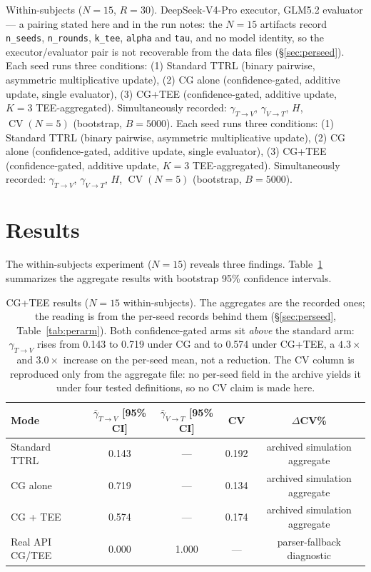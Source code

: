 \documentclass[11pt]{article}
\DeclareMathOperator{\CV}{CV}
\begin{document}
Within-subjects ($N{=}15$, $R{=}30$). DeepSeek-V4-Pro executor, GLM5.2 evaluator --- a pairing stated here and in the run notes: the $N{=}15$ artifacts record \texttt{n\_seeds}, \texttt{n\_rounds}, \texttt{k\_tee}, \texttt{alpha} and \texttt{tau}, and no model identity, so the executor/evaluator pair is not recoverable from the data files (\S\ref{sec:perseed}). Each seed runs three conditions: (1) Standard TTRL (binary pairwise, asymmetric multiplicative update), (2) CG alone (confidence-gated, additive update, single evaluator), (3) CG+TEE (confidence-gated, additive update, $K{=}3$ TEE-aggregated). Simultaneously recorded: $\gamma_{T\to V}$, $\gamma_{V\to T}$, $H$, $\CV(N{=}5)$ (bootstrap, $B{=}5000$). Each seed runs three conditions: (1) Standard TTRL (binary pairwise, asymmetric multiplicative update), (2) CG alone (confidence-gated, additive update, single evaluator), (3) CG+TEE (confidence-gated, additive update, $K{=}3$ TEE-aggregated). Simultaneously recorded: $\gamma_{T\to V}$, $\gamma_{V\to T}$, $H$, $\CV(N{=}5)$ (bootstrap, $B{=}5000$).

\section{Results}

The within-subjects experiment ($N{=}15$) reveals three findings. Table~\ref{tab:results} summarizes the aggregate results with bootstrap 95\% confidence intervals.

\begin{table}[H]
\centering
\caption{CG+TEE results ($N{=}15$ within-subjects). The aggregates are the recorded ones; the reading is from the per-seed records behind them (\S\ref{sec:perseed}, Table~\ref{tab:perarm}). Both confidence-gated arms sit \emph{above} the standard arm: $\gamma_{T\to V}$ rises from 0.143 to 0.719 under CG and to 0.574 under CG+TEE, a $4.3\times$ and $3.0\times$ increase on the per-seed mean, not a reduction. The CV column is reproduced only from the aggregate file: no per-seed field in the archive yields it under four tested definitions, so no CV claim is made here.}
\label{tab:results}
\begin{tabular}{@{}lcccc@{}}
\toprule
\textbf{Mode} & $\bar{\gamma}_{T{\to}V}$ [95\% CI] & $\bar{\gamma}_{V{\to}T}$ [95\% CI] & CV & $\Delta$CV\% \\
\midrule
Standard TTRL   & 0.143 & --- & 0.192 & archived simulation aggregate \\
CG alone        & 0.719 & --- & 0.134 & archived simulation aggregate \\
CG + TEE        & 0.574 & --- & 0.174 & archived simulation aggregate \\
Real API CG/TEE & 0.000 & 1.000 & --- & parser-fallback diagnostic \\
\bottomrule
\end{tabular}
\end{table}
\end{document}
